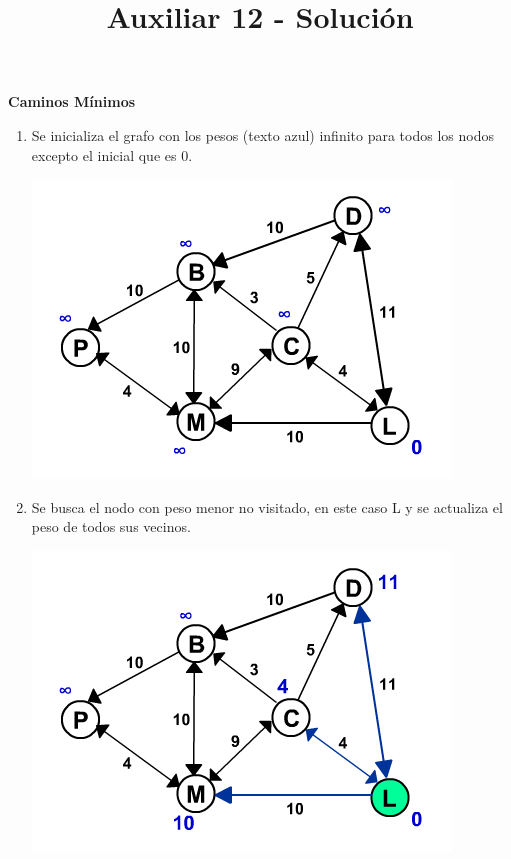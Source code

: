 \documentclass[dcc,sol]{fcfmcourse}
\title{Auxiliar 12 - Solución}
\begin{document}
\maketitle

\vspace{-1ex}

\begin{problems}

\problem \textbf{Caminos Mínimos}

\begin{enumerate}[1.]

\item Se inicializa el grafo con los pesos (texto azul) infinito para todos los nodos excepto el inicial que es 0.
\begin{center}
\includegraphics[scale=0.65]{dijkstra0001.png}
\end{center}

\item Se busca el nodo con peso menor no visitado, en este caso L y se actualiza el peso de todos sus vecinos.
\begin{center}
\includegraphics[scale=0.65]{dijkstra0002.png}
\end{center}


\end{enumerate}
\end{problems}
\end{document}

